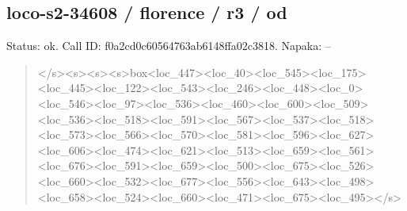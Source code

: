 \documentclass[10pt,a4paper]{article}
\begin{document}
\subsection*{loco-s2-34608 / florence / r3 / od}
Status: ok. Call ID: f0a2cd0c60564763ab6148ffa02c3818. Napaka: --
\begin{quote}\footnotesize
</s>\allowbreak{}<s>\allowbreak{}<s>\allowbreak{}<s>\allowbreak{}box<loc\_447>\allowbreak{}<loc\_40\allowbreak{}>\allowbreak{}<loc\_545>\allowbreak{}<loc\_175>\allowbreak{}<loc\_445>\allowbreak{}<loc\allowbreak{}\_122>\allowbreak{}<loc\_543>\allowbreak{}<loc\_246>\allowbreak{}<loc\_448>\allowbreak{}\allowbreak{}<loc\_0>\allowbreak{}<loc\_546>\allowbreak{}<loc\_97>\allowbreak{}<loc\_536\allowbreak{}>\allowbreak{}<loc\_460>\allowbreak{}<loc\_600>\allowbreak{}<loc\_509>\allowbreak{}<loc\allowbreak{}\_536>\allowbreak{}<loc\_518>\allowbreak{}<loc\_591>\allowbreak{}<loc\_567>\allowbreak{}\allowbreak{}<loc\_537>\allowbreak{}<loc\_518>\allowbreak{}<loc\_573>\allowbreak{}<loc\_\allowbreak{}566>\allowbreak{}<loc\_570>\allowbreak{}<loc\_581>\allowbreak{}<loc\_596>\allowbreak{}<\allowbreak{}loc\_627>\allowbreak{}<loc\_606>\allowbreak{}<loc\_474>\allowbreak{}<loc\_6\allowbreak{}21>\allowbreak{}<loc\_513>\allowbreak{}<loc\_659>\allowbreak{}<loc\_561>\allowbreak{}<l\allowbreak{}oc\_676>\allowbreak{}<loc\_591>\allowbreak{}<loc\_659>\allowbreak{}<loc\_50\allowbreak{}0>\allowbreak{}<loc\_675>\allowbreak{}<loc\_526>\allowbreak{}<loc\_660>\allowbreak{}<lo\allowbreak{}c\_532>\allowbreak{}<loc\_677>\allowbreak{}<loc\_556>\allowbreak{}<loc\_643\allowbreak{}>\allowbreak{}<loc\_498>\allowbreak{}<loc\_658>\allowbreak{}<loc\_524>\allowbreak{}<loc\allowbreak{}\_660>\allowbreak{}<loc\_471>\allowbreak{}<loc\_675>\allowbreak{}<loc\_495>\allowbreak{}\allowbreak{}</s>\allowbreak{}
\end{quote}
\end{document}
